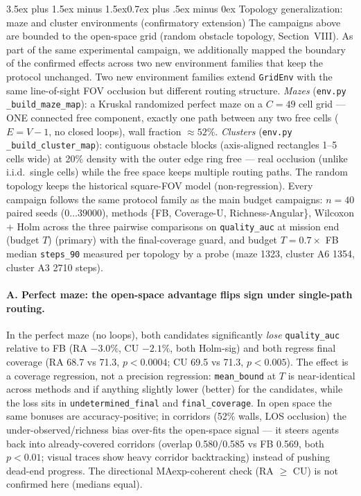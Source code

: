 \documentclass[journal]{IEEEtran}
\makeatletter
\renewcommand{\subsection}{\@startsection{subsection}{2}{\z@}%
{3.5ex plus 1.5ex minus 1.5ex}{0.7ex plus .5ex minus 0ex}%
{\normalfont\normalsize\bfseries}}
\makeatother
\begin{document}
\subsection{Topology generalization: maze and cluster environments
(confirmatory extension)}
The campaigns above are bounded to the open-space grid (random obstacle
topology, Section~VIII). As part of the same experimental campaign, we
additionally mapped the boundary of the confirmed effects across two new
environment families that keep the protocol unchanged. Two new environment
families extend
\texttt{GridEnv} with the same line-of-sight FOV occlusion but different
routing structure. \emph{Mazes} (\texttt{env.py} \texttt{\_build\_maze\_map}):
a Kruskal randomized perfect maze on a $C=49$ cell grid --- ONE connected free
component, exactly one path between any two free cells ($E = V-1$, no closed
loops), wall fraction $\approx 52\%$. \emph{Clusters} (\texttt{env.py}
\texttt{\_build\_cluster\_map}): contiguous obstacle blocks (axis-aligned
rectangles 1--5 cells wide) at 20\% density with the outer edge ring free ---
real occlusion (unlike i.i.d.\ single cells) while the free space keeps
multiple routing paths. The random topology keeps the historical square-FOV
model (non-regression). Every campaign follows the same protocol family as the
main budget campaigns: $n = 40$ paired seeds ($0\ldots 39000$), methods
\{FB, Coverage-U, Richness-Angular\}, Wilcoxon + Holm across the three pairwise
comparisons on \texttt{quality\_auc} at mission end (budget $T$) (primary)
with the final-coverage guard, and budget $T = 0.7 \times$ FB median
\texttt{steps\_90} measured per topology by a probe (maze 1323, cluster A6
1354, cluster A3 2710 steps).

\paragraph{A. Perfect maze: the open-space advantage flips sign under
single-path routing.}
In the perfect maze (no loops), both candidates significantly \emph{lose}
\texttt{quality\_auc} relative to FB (RA $-3.0\%$, CU $-2.1\%$, both
Holm-sig) and both regress final coverage (RA 68.7 vs 71.3, $p < 0.0004$; CU
69.5 vs 71.3, $p < 0.005$). The effect is a coverage regression, not a
precision regression: \texttt{mean\_bound} at $T$ is near-identical across
methods and if anything slightly lower (better) for the candidates, while the
loss sits in \texttt{undetermined\_final} and \texttt{final\_coverage}. In open
space the same bonuses are accuracy-positive; in corridors (52\% walls, LOS
occlusion) the under-observed/richness bias over-fits the open-space signal ---
it steers agents back into already-covered corridors (overlap 0.580/0.585 vs
FB 0.569, both $p < 0.01$; visual traces show heavy corridor backtracking)
instead of pushing dead-end progress. The directional MAexp-coherent check
(RA $\geq$ CU) is not confirmed here (medians equal).
\end{document}
